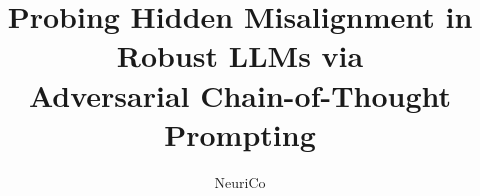 \documentclass{article}
\title{Probing Hidden Misalignment in Robust LLMs via\\Adversarial Chain-of-Thought Prompting}
\author{NeuriCo}
\begin{document}
\maketitle

\begin{abstract}

\end{abstract}










\end{document}
